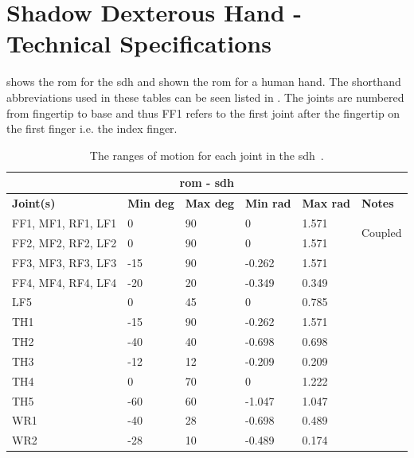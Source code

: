 \chapter{Shadow Dexterous Hand - Technical Specifications}\label{app:shadow-dexterous-hand-technical-specifications}

 shows the \gls{rom} for the \gls{sdh} and  shown the \gls{rom} for a human hand. The shorthand abbreviations used in these tables can be seen listed in . The joints are numbered from fingertip to base and thus FF1 refers to the first joint after the fingertip on the first finger i.e. the index finger.
\begin{table}[!h]
\begin{center}
	\begin{tabular}{ |p{}|p{}|p{}|p{}|p{}|p{}| } 
	\hline
	\multicolumn{6}{|c|}{\textbf{\gls{rom} - \gls{sdh}}} \\ \hline
	\textbf{Joint(s)} & \textbf{Min deg} & \textbf{Max deg} & \textbf{Min rad} & \textbf{Max rad} & \textbf{Notes} \\ \hline
	FF1, MF1, RF1, LF1 &0&90&0&1.571  & \multirow{2}{4em}{Coupled}\\ \cline{1-5}
	FF2, MF2, RF2, LF2 & 0   & 90 & 0      & 1.571 & \\ \hline
	FF3, MF3, RF3, LF3 & -15 & 90 & -0.262 & 1.571 & \\ \hline
	FF4, MF4, RF4, LF4 & -20 & 20 & -0.349 & 0.349 & \\ \hline
	LF5&0&45&0&0.785 &  \\ \hline
	TH1&-15&90&-0.262&1.571 &  \\ \hline
	TH2&-40&40&-0.698&0.698 &  \\ \hline
	TH3&-12&12&-0.209&0.209 &  \\ \hline
	TH4&0&70&0&1.222& \\ \hline
	TH5&-60&60&-1.047&1.047& \\ \hline
	WR1&-40&28&-0.698&0.489& \\ \hline
	WR2&-28&10&-0.489&0.174& \\ \hline
	\end{tabular}
	\caption{The ranges of motion for each joint in the \gls{sdh}~\cite{range-of-motion-shadow-hand}.}
	\label{app:range-of-motion-shadow-hand}
\end{center}
\end{table}

